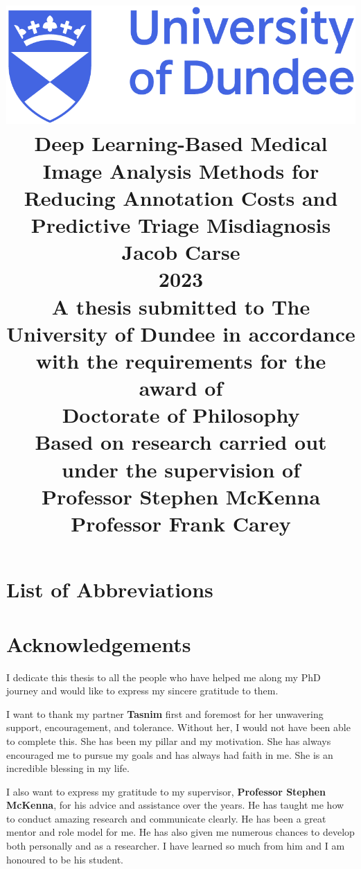 \documentclass[12pt]{report}
\title{
	{\includegraphics[scale=0.4]{dundee_logo.png}}\\
	\vspace{15mm}
	{Deep Learning-Based Medical Image Analysis Methods for Reducing Annotation Costs and Predictive Triage Misdiagnosis}\\
	\vspace{5mm}
	{\Large Jacob Carse}\\
	{\Large 2023}\\
	\vspace{5mm}
	{\normalsize A thesis submitted to The University of Dundee in accordance with the requirements for the award of}\\
	{\large Doctorate of Philosophy}\\
	\vspace{5mm}
	{\normalsize Based on research carried out under the supervision of}\\
	{\large Professor Stephen McKenna}\\
	{\large Professor Frank Carey}
}
\date{\vspace{-5ex}}
\author{}
\begin{document}
	
	\maketitle
	
	\renewcommand{\contentsname}{Table of Contents}
	\tableofcontents
	
	\newpage
	\listoffigures
	
	\newpage
	\listoftables
	
	
	\newpage
	\chapter*{List of Abbreviations}
	
	
	
	\newpage
	\chapter*{Acknowledgements}
	I dedicate this thesis to all the people who have helped me along my PhD journey and would like to express my sincere gratitude to them.
	
	I want to thank my partner \textbf{Tasnim} first and foremost for her unwavering support, encouragement, and tolerance. Without her, I would not have been able to complete this. She has been my pillar and my motivation. She has always encouraged me to pursue my goals and has always had faith in me. She is an incredible blessing in my life.
	
	I also want to express my gratitude to my supervisor, \textbf{Professor Stephen McKenna}, for his advice and assistance over the years. He has taught me how to conduct amazing research and communicate clearly. He has been a great mentor and role model for me. He has also given me numerous chances to develop both personally and as a researcher. I have learned so much from him and I am honoured to be his student.
	
\end{document}
